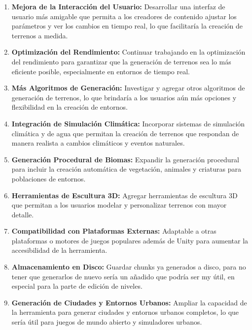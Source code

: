 \begin{enumerate}
    \item \textbf{Mejora de la Interacción del Usuario:} Desarrollar una interfaz de usuario más amigable que permita a los creadores de contenido ajustar los parámetros y ver los cambios en tiempo real, lo que facilitaría la creación de terrenos a medida.
    
    \item \textbf{Optimización del Rendimiento:} Continuar trabajando en la optimización del rendimiento para garantizar que la generación de terrenos sea lo más eficiente posible, especialmente en entornos de tiempo real.
    
    \item \textbf{Más Algoritmos de Generación:} Investigar y agregar otros algoritmos de generación de terrenos, lo que brindaría a los usuarios aún más opciones y flexibilidad en la creación de entornos.
    
    \item \textbf{Integración de Simulación Climática:} Incorporar sistemas de simulación climática y de agua que permitan la creación de terrenos que respondan de manera realista a cambios climáticos y eventos naturales.
    
    \item \textbf{Generación Procedural de Biomas:} Expandir la generación procedural para incluir la creación automática de vegetación, animales y criaturas para poblaciones de entornos.
    
    \item \textbf{Herramientas de Escultura 3D:} Agregar herramientas de escultura 3D que permitan a los usuarios modelar y personalizar terrenos con mayor detalle.
    
    \item \textbf{Compatibilidad con Plataformas Externas:} Adaptable a otras plataformas o motores de juegos populares además de Unity para aumentar la accesibilidad de la herramienta.
    
    \item \textbf{Almacenamiento en Disco:} Guardar chunks ya generados a disco, para no tener que generarlos de nuevo sería un añadido que podría ser my útil, en especial para la parte de edición de niveles.
    
    \item \textbf{Generación de Ciudades y Entornos Urbanos:} Ampliar la capacidad de la herramienta para generar ciudades y entornos urbanos completos, lo que sería útil para juegos de mundo abierto y simuladores urbanos.
    

\end{enumerate}
